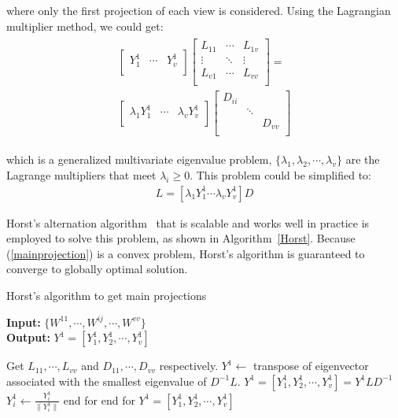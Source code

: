 \documentclass[journal]{IEEEtran}
\begin{document}
where only the first projection of each view is considered. 
Using the Lagrangian multiplier method, we could get: 
\begin{align}
\begin{split}
\left[
\begin{array}{ccc}
Y_1^1 & \cdots & Y_v^1 \\
\end{array}
\right]
\left[
\begin{array}{ccc}
L_{11} & \cdots & L_{1v} \\
\vdots & \ddots & \vdots \\
L_{v1} & \cdots &L_{vv} \\
\end{array}
\right]= \\
\left[
\begin{array}{ccc}
\lambda_1Y_1^1 & \cdots & \lambda_vY_v^1 \\
\end{array}
\right]
\left[
\begin{array}{ccc}
D_{ii} & \  & \  \\
\ & \ddots & \ \\
\ & \ & D_{vv} \\
\end{array}
\right]
\end{split}
\end{align}

which is a generalized multivariate eigenvalue problem, $\{\lambda_1, \lambda_2, \cdots, \lambda_v\}$ are the Lagrange multipliers that meet $\lambda_i\geq 0$. 
This problem could be simplified to: 
\begin{gather}
[Y_1^1 \cdots Y_v^1] L = [\lambda_1Y_1^1  \cdots  \lambda_vY_v^1] D
\end{gather}

Horst's alternation algorithm~\cite{Horst} that is scalable and works well in practice is employed to solve this problem, as shown in Algorithm~\ref{Horst}. 
Because (\ref{mainprojection}) is a convex problem, Horst's algorithm is guaranteed to converge to globally optimal solution. 

\begin{algorithm}[t]
\caption{Horst's algorithm to get main projections} 
\label{Horst}
\hspace*{0.02in} {\bf Input:}
$\{W^{11}, \cdots, W^{ij}, \cdots, W^{vv}\}$ \\
\hspace*{0.02in} {\bf Output:} 
$Y^1 = [Y_1^1, Y_2^1, \cdots, Y_v^1]$
\begin{algorithmic}[1]
\State Get $L_{11}, \cdots, L_{vv}$ and $D_{11}, \cdots, D_{vv}$ respectively. 
\State $Y^1\gets$  transpose of eigenvector associated with the smallest eigenvalue of $D^{-1}L$.
\State $Y^1 = [Y_1^1, Y_2^1, \cdots, Y_v^1] = Y^1 L D^{-1}$
\State $Y_i^1\gets \frac{Y_i^1}{\|Y_i^1\|}$
\EndFor
\State end for
\EndFor
\State end for
\State \Return $Y^1 = [Y_1^1, Y_2^1, \cdots, Y_v^1]$
\end{algorithmic}
\end{algorithm}
\end{document}
